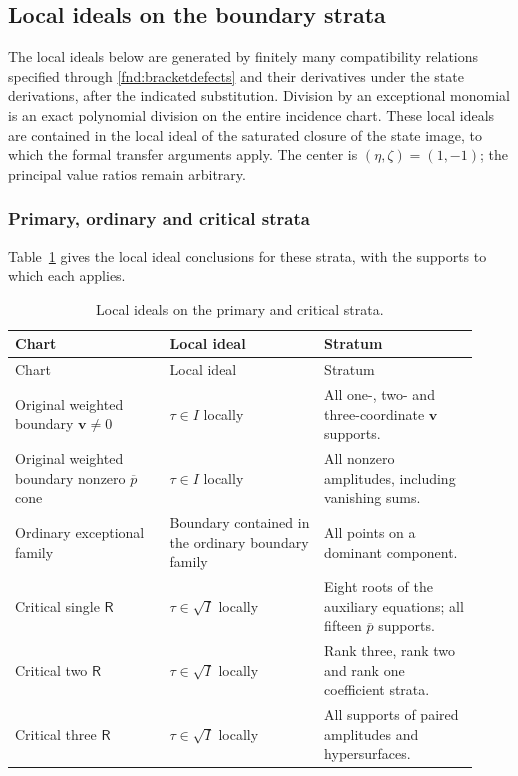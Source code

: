 \documentclass[11pt,a4paper]{article}
\numberwithin{equation}{section}
\theoremstyle{plain}
\theoremstyle{definition}
\theoremstyle{remark}
\begin{document}
\subsection{Local ideals on the boundary strata}\label{r3:boundarysources}
The local ideals below are generated by finitely many compatibility relations
specified through \eqref{fnd:bracketdefects} and their derivatives under the state derivations,
after the indicated substitution. Division by an exceptional monomial is an exact polynomial division
on the entire incidence chart.
These local ideals are contained in the local ideal of the saturated closure of the state image, to which the formal transfer arguments apply.
The center is $(\eta ,\zeta )=(1,-1)$; the principal value ratios remain arbitrary.

\subsubsection{Primary, ordinary and critical strata}

Table~\ref{tab:r3-primary-ideals} gives the local ideal conclusions
for these strata, with the supports to which each applies.

\begin{longtable}{@{}p{0.305\linewidth}p{0.305\linewidth}p{0.305\linewidth}@{}}

\caption{Local ideals on the primary and critical strata.}\label{tab:r3-primary-ideals}\\
\toprule Chart & Local ideal & Stratum\\\midrule\endfirsthead
\toprule Chart & Local ideal & Stratum\\\midrule\endhead

Original weighted boundary $\boldsymbol v\ne0$ & $\tau\in I$ locally & All one-, two- and three-coordinate $\boldsymbol v$ supports.\\

Original weighted boundary nonzero $\overline p$ cone & $\tau\in I$ locally & All nonzero amplitudes, including vanishing sums.\\

Ordinary exceptional family & Boundary contained in the ordinary boundary family & All points on a dominant component.\\

Critical single $\mathsf R$ & $\tau\in\sqrt I$ locally & Eight roots of the auxiliary equations; all fifteen $\overline p$ supports.\\

Critical two $\mathsf R$ & $\tau\in\sqrt I$ locally & Rank three, rank two and rank one coefficient strata.\\

Critical three $\mathsf R$ & $\tau\in\sqrt I$ locally & All supports of paired amplitudes and hypersurfaces.\\

\bottomrule\end{longtable}
\end{document}
